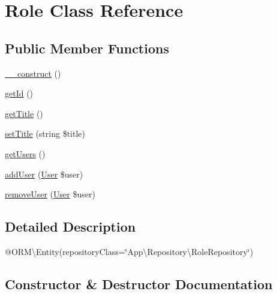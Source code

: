 \hypertarget{class_app_1_1_entity_1_1_role}{}\section{Role Class Reference}
\label{class_app_1_1_entity_1_1_role}
\subsection*{Public Member Functions}
\begin{DoxyCompactItemize}
\item 
\mbox{\hyperlink{class_app_1_1_entity_1_1_role_a095c5d389db211932136b53f25f39685}{\+\_\+\+\_\+construct}} ()
\item 
\mbox{\hyperlink{class_app_1_1_entity_1_1_role_a12251d0c022e9e21c137a105ff683f13}{get\+Id}} ()
\item 
\mbox{\hyperlink{class_app_1_1_entity_1_1_role_a95e859a4588a39a1824b717378a84c29}{get\+Title}} ()
\item 
\mbox{\hyperlink{class_app_1_1_entity_1_1_role_a754ef3032cc3ffb25ad2d1a13720fc29}{set\+Title}} (string \$title)
\item 
\mbox{\hyperlink{class_app_1_1_entity_1_1_role_a0fc10b64683021b70c7eb95fb514c119}{get\+Users}} ()
\item 
\mbox{\hyperlink{class_app_1_1_entity_1_1_role_af15e3605d4dc1c169f30bfb79314eed1}{add\+User}} (\mbox{\hyperlink{class_app_1_1_entity_1_1_user}{User}} \$user)
\item 
\mbox{\hyperlink{class_app_1_1_entity_1_1_role_aa668d0594f02dc524f8a92e4f4625ae3}{remove\+User}} (\mbox{\hyperlink{class_app_1_1_entity_1_1_user}{User}} \$user)
\end{DoxyCompactItemize}


\subsection{Detailed Description}
@\+O\+RM\textbackslash{}\+Entity(repository\+Class=\char`\"{}\+App\textbackslash{}\+Repository\textbackslash{}\+Role\+Repository\char`\"{}) 

\subsection{Constructor \& Destructor Documentation}
\mbox{\label{class_app_1_1_entity_1_1_role_a095c5d389db211932136b53f25f39685}} 
